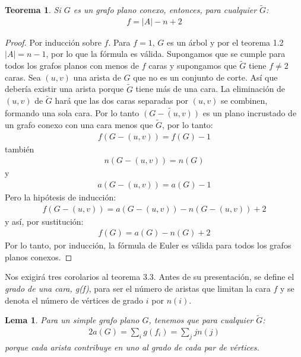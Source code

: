 \documentclass[10pt,a5paper]{book}
\newtheorem{teorema}{Teorema}[chapter]
\newtheorem{lem}[]{Lema}[chapter]
\begin{document}
\begin{teorema}
Si $G$ es un grafo plano conexo, entonces, para cualquier $\widetilde{G}$:
\begin{align}
f = |A| - n + 2\nonumber
\end{align}
\end{teorema}
\begin{proof}
Por inducción sobre $f$. Para $f=1$, $G$ es un árbol y por el teorema 1.2 $|A| = n - 1$, por lo que la fórmula es válida. Supongamos que se cumple para todos los grafos planos con menos de $f$ caras y supongamos que $\widetilde{G}$ tiene $f \ne 2$ caras. Sea $(u,v)$ una arista de $G$ que no es un conjunto de corte. Así que debería existir una arista porque $\widetilde{G}$ tiene más de una cara. La eliminación de $(u,v)$ de $\widetilde{G}$ hará que las dos caras separadas por $(u,v)$ se combinen, formando una sola cara. Por lo tanto $\widetilde{(G-(u,v))}$ es un plano incrustado de un grafo conexo con una cara menos que $\widetilde{G}$, por lo tanto:
\begin{align}
f(G-(u,v)) = f(G) -1\nonumber
\end{align}
también
\begin{align}
n(G -(u,v)) = n(G)\nonumber
\end{align}
y
\begin{align}
a(G-(u,v)) = a(G) -1\nonumber
\end{align}
Pero la hipótesis de inducción:
\begin{align}
f(G-(u,v)) = a(G-(u,v)) -n(G-(u,v))+2\nonumber
\end{align}
y así, por sustitución:
\begin{align}
f(G) = a(G) - n(G) +2\nonumber
\end{align}
Por lo tanto, por inducción, la fórmula de Euler es válida para todos los grafos planos conexos.
\end{proof}

Nos exigirá tres corolarios al teorema 3.3. Antes de su presentación, se define el \emph{grado de una cara, g(f)}, para ser el número de aristas que limitan la cara $f$ y se denota el número de vértices de grado $i$ por $n(i)$.

\begin{lem}
Para un simple grafo plano $G$, tenemos que para cualquier $\widetilde{G}$:
\begin{align}
2a(G) = \sum_i g(f_i) = \sum_j jn(j)\nonumber
\end{align}
porque cada arista contribuye en uno al grado de cada par de vértices.
\end{lem}
\end{document}
